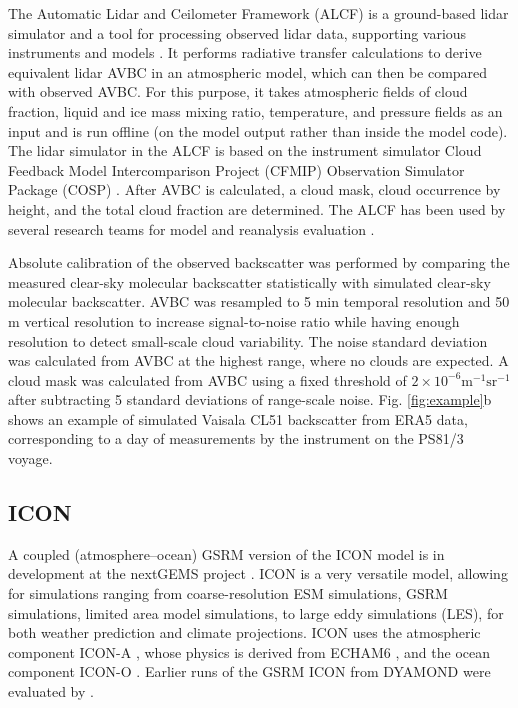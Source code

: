 \documentclass[12pt,a4paper]{article}
\begin{document}
The Automatic Lidar and Ceilometer Framework (ALCF) is a ground-based lidar
simulator and a tool for processing observed lidar data, supporting various
instruments and models \citep{kuma2021}. It performs radiative transfer
calculations to derive equivalent lidar AVBC in an atmospheric model, which can
then be compared with observed AVBC. For this purpose, it takes atmospheric
fields of cloud fraction, liquid and ice mass mixing ratio, temperature, and
pressure fields as an input and is run offline (on the model output rather than
inside the model code). The lidar simulator in the ALCF is based on the
instrument simulator Cloud Feedback Model Intercomparison Project (CFMIP)
Observation Simulator Package (COSP) \citep{bodas-salcedo2011}.  After AVBC is
calculated, a cloud mask, cloud occurrence by height, and the total cloud
fraction are determined. The ALCF has been used by several research teams for
model and reanalysis evaluation
\citep{kuma2020,kremser2021,guyot2022,pei2023,whitehead2023,mcdonald2024}.

Absolute calibration of the observed backscatter was performed by comparing the
measured clear-sky molecular backscatter statistically with simulated clear-sky
molecular backscatter. AVBC was resampled to 5 min temporal resolution and 50 m
vertical resolution to increase signal-to-noise ratio while having enough
resolution to detect small-scale cloud variability. The noise standard
deviation was calculated from AVBC at the highest range, where no clouds are
expected.  A cloud mask was calculated from AVBC using a fixed threshold of
$\mathrm{2\times 10^{-6} m^{-1}sr^{-1}}$ after subtracting 5 standard
deviations of range-scale noise. Fig. \ref{fig:example}b shows an example of
simulated Vaisala CL51 backscatter from ERA5 data, corresponding to a day of
measurements by the instrument on the PS81/3 voyage.

\subsection{ICON}

A coupled (atmosphere--ocean) GSRM version of the ICON model is in development
at the nextGEMS project \citep{hohenegger2023}. ICON is a very versatile model,
allowing for simulations ranging from coarse-resolution ESM simulations, GSRM
simulations, limited area model simulations, to large eddy simulations (LES),
for both weather prediction and climate projections. ICON uses the atmospheric
component ICON-A \citep{giorgetta2018}, whose physics is derived from ECHAM6
\citep{stevens2013}, and the ocean component ICON-O \citep{korn2022}. Earlier
runs of the GSRM ICON from DYAMOND were evaluated by \cite{mauritsen2022}.
\end{document}
